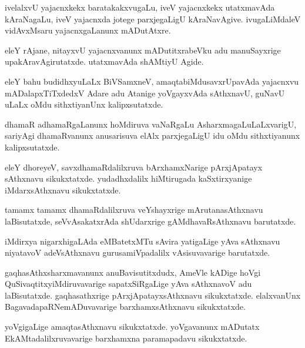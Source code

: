 \documentclass{article}
\begin{document}
\begin{mn}
ivelalxvU yajacnxkekx baratakakxvugaLu, iveV yajacnxkekx utatxmavAda
kAraNagaLu, iveV yajacnxda jotege parxjegaLigU
kAraNavAgive. ivugaLiMdaleV vidAvxMsaru yajacnxgaLanunx mADutAtxre.
\end{mn}

\begin{mn}%
eleY rAjane, nitayxvU yajacnxvanunx mADutitxrabeVku adu manuSayxrige
upakAravAgirutatxde. utatxmavAda shAMtiyU Agide.
\end{mn}

\begin{mn}
eleY bahu budidhxyuLaLx BiVSamxneV, amaqtabiMdusavxrUpavAda yajacnxvu
mADalapxTiTxdedxV Adare adu Atanige yoVgayxvAda sAthxnavU, guNavU
uLaLx oMdu sithxtiyanUnx kalipxsutatxde.
\end{mn}

\begin{mn}
dhamaR adhamaRgaLanunx hoMdiruva vaNaRgaLu AsharxmagaLuLaLxvarigU,
sariyAgi dhamaRvanunx anusarisuva elAlx parxjegaLigU idu oMdu
sithxtiyanunx kalipxsutatxde.
\end{mn}

\begin{mn}
eleY dhoreyeV, savxdhamaRdalilxruva bArxhamxNarige pArxjApatayx
sAthxnavu sikukxtatxde. yudadhxdalilx hiMtirugada kaSxtirxyanige
iMdarxsAthxnavu sikukxtatxde.
\end{mn}

\begin{mn}%
tamamx tamamx dhamaRdalilxruva veYshayxrige mArutanasAthxnavu
laBisutatxde, seVvAsakatxrAda shUdarxrige gAMdhavaRsAthxnavu barutatxde.
\end{mn}

\begin{mn}
iMdirxya nigarxhigaLAda eMBatetxMTu sAvira yatigaLige yAva sAthxnavu
niyatavoV adeVsAthxnavu gurusamiVpadalilx vAsisuvavarige barutatxde.
\end{mn}

\begin{mn}
gaqhasAthxsharxmavanunx anuBavisutitxdudx, AmeVle kADige hoVgi
QuSivaqtitxyiMdiruvavarige sapatxSiRgaLige yAva sAthxnavoV adu
laBisutatxde. gaqhasathxrige pArxjApatayxsAthxnavu
sikukxtatxde. elalxvanUnx BagavadapaRNemADuvavarige barxhamxsAthxnavu sikukxtatxde.
\end{mn}

\begin{mn}
yoVgigaLige amaqtasAthxnavu sikukxtatxde. yoVgavanunx mADutatx
EkAMtadalilxruvavarige barxhamxna paramapadavu sikukxtatxde.
\end{mn}
\end{document}
